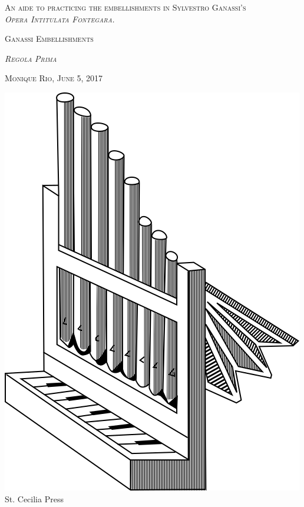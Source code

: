 \documentclass[11pt]{book}
\begin{document}
\pagestyle{fancy}

\fancyhf{}

\fancyhead[LE,RO]{\thepage}
\fancyhead[C]{   \leftmark }


\renewcommand{\headrulewidth}{0pt}
\renewcommand{\footrulewidth}{0pt}
\renewcommand{\chaptermark}[1]{\markboth{\MakeUppercase{#1}}{}}

\setlength{\parindent}{0pt}
\setlength{\parskip}{11pt plus 2pt minus 4pt}

\begin{titlepage}
    \centering
    \vspace*{2.5cm}
    {\scshape\Large An aide to practicing the embellishments in Sylvestro Ganassi's\\ 
    \em{Opera Intitulata Fontegara}. \par}
    \vspace{1cm}
    {\scshape\Huge Ganassi Embellishments} \\
    {\scshape \Huge \textit{Regola Prima} \par}
    \vspace{1cm}
    {\scshape\normalsize Monique Rio, June 5, 2017 \par}
    \vspace{2cm}
    \vfill
    \includegraphics[scale=.5]{stcpress.png}\\
    {\large St. Cecilia Press}
\end{titlepage}
\end{document}
